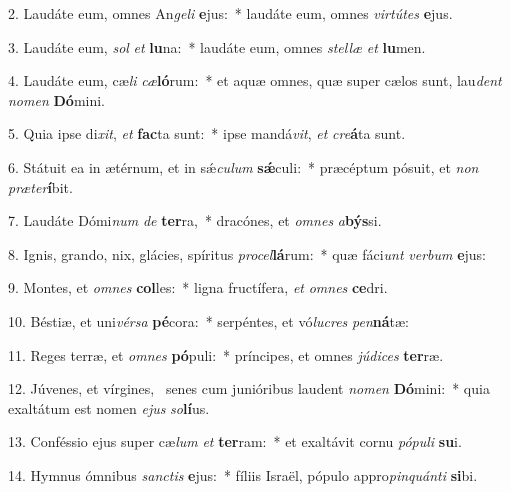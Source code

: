 2. Laudáte eum, omnes An\textit{ge}\textit{li} \textbf{e}jus:~*  laudáte eum, omnes \textit{vir}\textit{tú}\textit{tes} \textbf{e}jus.\

3. Laudáte eum, \textit{sol} \textit{et} \textbf{lu}na:~*  laudáte eum, omnes \textit{stel}\textit{læ} \textit{et} \textbf{lu}men.\

4. Laudáte eum, cæ\textit{li} \textit{cæ}\textbf{ló}rum:~*  et aquæ omnes, quæ super cælos sunt, lau\textit{dent} \textit{no}\textit{men} \textbf{Dó}mini.\

5. Quia ipse di\textit{xit}, \textit{et} \textbf{fac}ta sunt:~*  ipse mandá\textit{vit}, \textit{et} \textit{cre}\textbf{á}ta sunt.\

6. Státuit ea in ætérnum, et in sǽ\textit{cu}\textit{lum} \textbf{sǽ}culi:~*  præcéptum pósuit, et \textit{non} \textit{præ}\textit{ter}\textbf{í}bit.\

7. Laudáte Dómi\textit{num} \textit{de} \textbf{ter}ra,~*  dracónes, et \textit{om}\textit{nes} \textit{a}\textbf{býs}si.\

8. Ignis, grando, nix, glácies, spíritus \textit{pro}\textit{cel}\textbf{lá}rum:~*  quæ fáci\textit{unt} \textit{ver}\textit{bum} \textbf{e}jus:\

9. Montes, et \textit{om}\textit{nes} \textbf{col}les:~*  ligna fructífera, \textit{et} \textit{om}\textit{nes} \textbf{ce}dri.\

10. Béstiæ, et uni\textit{vér}\textit{sa} \textbf{pé}cora:~*  serpéntes, et vó\textit{lu}\textit{cres} \textit{pen}\textbf{ná}tæ:\

11. Reges terræ, et \textit{om}\textit{nes} \textbf{pó}puli:~*  príncipes, et omnes \textit{jú}\textit{di}\textit{ces} \textbf{ter}ræ.\

12. Júvenes, et vírgines, \dag\  senes cum junióribus laudent \textit{no}\textit{men} \textbf{Dó}mini:~*  quia exaltátum est nomen \textit{e}\textit{jus} \textit{so}\textbf{lí}us.\

13. Conféssio ejus super cæ\textit{lum} \textit{et} \textbf{ter}ram:~*  et exaltávit cornu \textit{pó}\textit{pu}\textit{li} \textbf{su}i.\

14. Hymnus ómnibus \textit{sanc}\textit{tis} \textbf{e}jus:~*  fíliis Israël, pópulo appro\textit{pin}\textit{quán}\textit{ti} \textbf{si}bi.\

